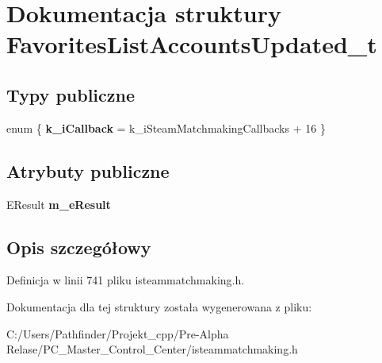 \hypertarget{struct_favorites_list_accounts_updated__t}{}\section{Dokumentacja struktury Favorites\+List\+Accounts\+Updated\+\_\+t}
\label{struct_favorites_list_accounts_updated__t}
\subsection*{Typy publiczne}
\begin{DoxyCompactItemize}
\item 
\mbox{\label{struct_favorites_list_accounts_updated__t_a559d8d9ad54ef09b0f5c50079195d1f4}} 
enum \{ {\bfseries k\+\_\+i\+Callback} = k\+\_\+i\+Steam\+Matchmaking\+Callbacks + 16
 \}
\end{DoxyCompactItemize}
\subsection*{Atrybuty publiczne}
\begin{DoxyCompactItemize}
\item 
\mbox{\label{struct_favorites_list_accounts_updated__t_ad582f1262ddc5b1f20a054d1de4bba61}} 
E\+Result {\bfseries m\+\_\+e\+Result}
\end{DoxyCompactItemize}


\subsection{Opis szczegółowy}


Definicja w linii 741 pliku isteammatchmaking.\+h.



Dokumentacja dla tej struktury została wygenerowana z pliku\+:\begin{DoxyCompactItemize}
\item 
C\+:/\+Users/\+Pathfinder/\+Projekt\+\_\+cpp/\+Pre-\/\+Alpha Relase/\+P\+C\+\_\+\+Master\+\_\+\+Control\+\_\+\+Center/isteammatchmaking.\+h\end{DoxyCompactItemize}

